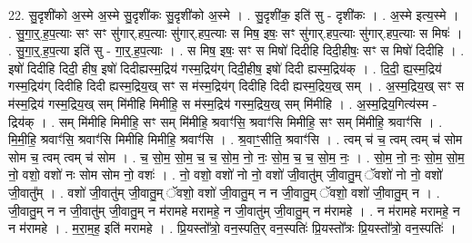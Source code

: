 \documentclass[17pt]{extarticle}
\begin{document}
22. सु॒दृशी॑को अ॒स्मे अ॒स्मे सु॒दृशी॑कः सु॒दृशी॑को अ॒स्मे । . सु॒दृशी॑क॒ इति॑ सु - दृशी॑कः । . अ॒स्मे इत्य॒स्मे । . सु॒गा॒र्॒.ह॒प॒त्याः सꣳ सꣳ सु॑गार्.हप॒त्याः सु॑गार्.हप॒त्याः स मिष॒ इषः॒ सꣳ सु॑गार्.हप॒त्याः सु॑गार्.हप॒त्याः स मिषः॑ । . सु॒गा॒र्॒.ह॒प॒त्या इति॑ सु - गा॒र्॒.ह॒प॒त्याः । . स मिष॒ इषः॒ सꣳ स मिषो॑ दिदीहि दिदी॒हीषः॒ सꣳ स मिषो॑ दिदीहि । . इषो॑ दिदीहि दिदी॒ हीष॒ इषो॑ दिदीह्यस्म॒द्रिय॑ गस्म॒द्रिय॑ग् दिदी॒हीष॒ इषो॑ दिदी ह्यस्म॒द्रिय॑क् । . दि॒दी॒ ह्य॒स्म॒द्रिय॑ गस्म॒द्रिय॑ग् दिदीहि दिदी ह्यस्म॒द्रिय॒ख् सꣳ स म॑स्म॒द्रिय॑ग् दिदीहि दिदी ह्यस्म॒द्रिय॒ख् सम् । . अ॒स्म॒द्रिय॒ख् सꣳ स म॑स्म॒द्रिय॑ गस्म॒द्रिय॒ख् सम् मि॑मीहि मिमीहि॒ स म॑स्म॒द्रिय॑ गस्म॒द्रिय॒ख् सम् मि॑मीहि । . अ॒स्म॒द्रिय॒गित्य॑स्म - द्रिय॑क् । . सम् मि॑मीहि मिमीहि॒ सꣳ सम् मि॑मीहि॒ श्रवाꣳ॑सि॒ श्रवाꣳ॑सि मिमीहि॒ सꣳ सम् मि॑मीहि॒ श्रवाꣳ॑सि । . मि॒मी॒हि॒ श्रवाꣳ॑सि॒ श्रवाꣳ॑सि मिमीहि मिमीहि॒ श्रवाꣳ॑सि । . श्र॒वाꣳ॒॒सीति॒ श्रवाꣳ॑सि । . त्वम् च॑ च॒ त्वम् त्वम् च॑ सोम सोम च॒ त्वम् त्वम् च॑ सोम । . च॒ सो॒म॒ सो॒म॒ च॒ च॒ सो॒म॒ नो॒ नः॒ सो॒म॒ च॒ च॒ सो॒म॒ नः॒ । . सो॒म॒ नो॒ नः॒ सो॒म॒ सो॒म॒ नो॒ वशो॒ वशो॑ नः सोम सोम नो॒ वशः॑ । . नो॒ वशो॒ वशो॑ नो नो॒ वशो॑ जी॒वातु॑म् जी॒वातु॒म् ॅवशो॑ नो नो॒ वशो॑ जी॒वातु᳚म् । . वशो॑ जी॒वातु॑म् जी॒वातु॒म् ॅवशो॒ वशो॑ जी॒वातु॒म् न न जी॒वातु॒म् ॅवशो॒ वशो॑ जी॒वातु॒म् न । . जी॒वातु॒म् न न जी॒वातु॑म् जी॒वातु॒म् न म॑रामहे मरामहे॒ न जी॒वातु॑म् जी॒वातु॒म् न म॑रामहे । . न म॑रामहे मरामहे॒ न न म॑रामहे । . म॒रा॒म॒ह॒ इति॑ मरामहे । . प्रि॒यस्तो᳚त्रो॒ वन॒स्पति॒र् वन॒स्पतिः॑ प्रि॒यस्तो᳚त्रः प्रि॒यस्तो᳚त्रो॒ वन॒स्पतिः॑ । \newline
\end{document}
